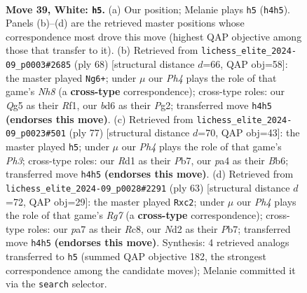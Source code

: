 \documentclass[11pt]{article}
\begin{document}
\clearpage

\begin{figure}[p]\centering
\begin{subfigure}{0.46\textwidth}\centering
\resizebox{\linewidth}{!}{%
\newchessgame
\chessboard[
  setfen={r5r1/p2k2pp/3b4/n2p2Q1/p2P2PP/4P2K/1q1N4/3R4 w - - 10 39},
  showmover=false,
  pgfstyle=straightmove, color=movearrow, markmove={h4-h5}
]}
\caption{}
\end{subfigure}\hfill
\begin{subfigure}{0.46\textwidth}\centering
\resizebox{\linewidth}{!}{%
\newchessgame
\chessboard[
  setfen={3r1kbN/1p4p1/3r1p2/q7/p6Q/P1N4P/1P4P1/5R1K w - - 6 35},
  showmover=false,
  pgfstyle=straightmove, color=movearrow, markmove={h8-g6}
]}
\caption{}
\end{subfigure}
\\[4pt]
\begin{subfigure}{0.46\textwidth}\centering
\resizebox{\linewidth}{!}{%
\newchessgame
\chessboard[
  setfen={8/1p5k/1bnP2pp/p7/P6q/1P1Bp3/6PP/3R1R1K b - - 1 39},
  showmover=false,
  pgfstyle=straightmove, color=movearrow, markmove={h6-h5}
]}
\caption{}
\end{subfigure}\hfill
\begin{subfigure}{0.46\textwidth}\centering
\resizebox{\linewidth}{!}{%
\newchessgame
\chessboard[
  setfen={2r4k/Qp2pp1p/2qp3P/4n3/8/P7/1PP3r1/K1R2R2 b - - 2 32},
  showmover=false,
  pgfstyle=straightmove, color=movearrow, markmove={g2-c2}
]}
\caption{}
\end{subfigure}
\caption{\textbf{Move 39, White: \texttt{h5}.} (a) Our position; Melanie plays \texttt{h5} (\texttt{h4h5}). Panels (b)--(d) are the retrieved master positions whose correspondence most drove this move (highest QAP objective among those that transfer to it). (b) Retrieved from \texttt{lichess\_elite\_2024-09\_p0003\#2685} (ply 68) [structural distance $d$=66, QAP obj=58]: the master played \texttt{Ng6+}; under $\mu$ our \emph{Ph4} plays the role of that game's \emph{Nh8} (a \textbf{cross-type} correspondence); cross-type roles: our \emph{Q}g5 as their \emph{R}f1, our \emph{b}d6 as their \emph{P}g2; transferred move \texttt{h4h5} \textbf{(endorses this move)}. (c) Retrieved from \texttt{lichess\_elite\_2024-09\_p0023\#501} (ply 77) [structural distance $d$=70, QAP obj=43]: the master played \texttt{h5}; under $\mu$ our \emph{Ph4} plays the role of that game's \emph{Ph3}; cross-type roles: our \emph{R}d1 as their \emph{P}b7, our \emph{p}a4 as their \emph{B}b6; transferred move \texttt{h4h5} \textbf{(endorses this move)}. (d) Retrieved from \texttt{lichess\_elite\_2024-09\_p0028\#2291} (ply 63) [structural distance $d$=72, QAP obj=29]: the master played \texttt{Rxc2}; under $\mu$ our \emph{Ph4} plays the role of that game's \emph{Rg7} (a \textbf{cross-type} correspondence); cross-type roles: our \emph{p}a7 as their \emph{R}c8, our \emph{N}d2 as their \emph{P}b7; transferred move \texttt{h4h5} \textbf{(endorses this move)}. Synthesis: 4 retrieved analogs transferred to \texttt{h5} (summed QAP objective 182, the strongest correspondence among the candidate moves); Melanie committed it via the \texttt{search} selector.}
\label{fig:thought-m76}
\end{figure}
\end{document}
